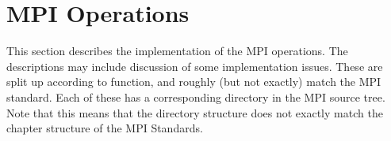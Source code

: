 \documentclass{article}
\begin{document}
\section{MPI Operations}
\label{sec:mpi-operations}
This section describes the implementation of the MPI operations.  The
descriptions may include discussion of some implementation issues.
These are split up according to function, and roughly (but not
exactly) match the MPI standard.  Each of these has a corresponding
directory in the MPI source tree.  Note that this means that the
directory structure does not exactly match the chapter structure of
the MPI Standards.



\end{document}
